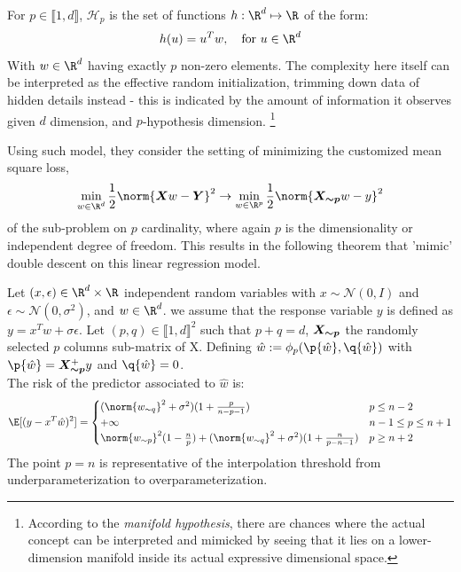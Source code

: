 \documentclass[10pt]{article} %
\begin{document}
\begin{definition}
For $p \in \llbracket1,d\rrbracket$, $\mathcal{H}_p$ is the set of functions $h:\R^d\mapsto \R$ of the form:
$$
h(u)=u^Tw,\quad \text{for }u \in \R^d
$$
With $w \in \R^d$ having exactly $p$ non-zero elements. The complexity here itself can be interpreted as the effective random initialization, trimming down data of hidden details instead - this is indicated by the amount of information it observes given $d$ dimension, and $p$-hypothesis dimension. \footnote{According to the \textit{manifold hypothesis}, there are chances where the actual concept can be interpreted and mimicked by seeing that it lies on a lower-dimension manifold inside its actual expressive dimensional space. }
\end{definition}
Using such model, they consider the setting of minimizing the customized mean square loss, 
\begin{equation}
\label{eq:linear_gaussian_erm}
\min_{w\in \R^d} \frac{1}{2}\norm{\bm{X} w - \bm{Y}}^2 \to \min_{w\in \R^p} \frac{1}{2}\norm{\bm{\Xp} w - y}^2
\end{equation}
of the sub-problem on $p$ cardinality, where again $p$ is the dimensionality or independent degree of freedom. This results in the following theorem that 'mimic' double descent on this linear regression model.
\begin{theorem}
\label{thm:double_descent_lr}
Let $(x, \epsilon)\in \R^d\times\R$ independent random variables with $x \sim \mathcal{N}(0,I)$  and $\epsilon \sim \mathcal{N}(0,\sigma^2)$, and $w \in \R^d$. we assume that the response variable $y$ is defined as $y=x^Tw +\sigma \epsilon$. Let $(p,q) \in \llbracket 1, d\rrbracket^2$ such that $p+q=d$, $\bm{X_{\sim p}}$ the randomly selected $p$ columns sub-matrix of X. Defining $\hat w:=\phi_p(\p{\hat w},\q{\hat w})$ with $\p{\hat w}=\bm{\Xp}^+y$ and $\q{\hat w} = 0$.\\
The risk of the predictor associated to $\hat w$ is:
\begin{equation}
    \E[(y-x^T\hat w)^2] = 
\begin{cases}
(\norm{\wq}^2+\sigma^2)(1+\frac{p}{n-p-1}) & p\leq  n-2\\
+\infty &n-1 \leq p\leq  n+1\\
\norm{\wp}^2(1-\frac{n}{p}) +  (\norm{\wq}^2+\sigma^2)(1+\frac{n}{p-n-1}) &p\geq n+2\end{cases}
\end{equation}
The point $p=n$ is representative of the interpolation threshold from underparameterization to overparameterization. 
\end{theorem}
\end{document}
